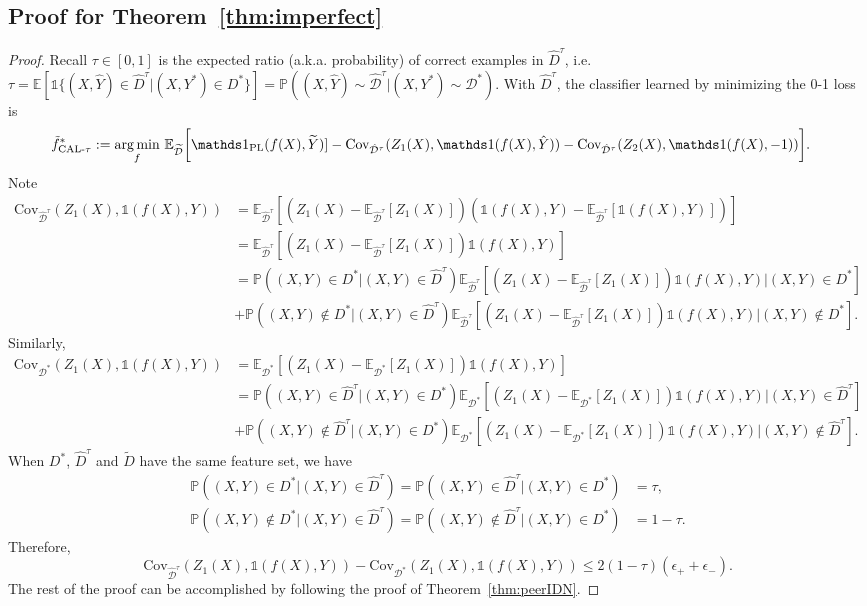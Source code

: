 \documentclass[final]{cvpr}
\DeclareMathOperator*{\argmin}{arg\,min}
\newcommand{\estDg}{{\hat D^{\tau}}}
\newcommand{\estDisg}{{\hat {\mathcal D}^{\tau}}}
\newcommand{\PP}{\mathbb P}
\newcommand{\BR}{\mathds 1}
\newcommand{\E}{\mathbb E}
\newcommand{\covpeer}{\text{CAL}}
\begin{document}
\subsection{Proof for Theorem~\ref{thm:imperfect}}\label{proof:imperfect}
\begin{proof}


Recall $\tau\in[0,1]$ is the expected ratio (a.k.a. probability) of correct examples in $\estDg$, i.e.
$\tau = \E[\BR \{ (X,\hat Y) \in \estDg | (X,Y^*) \in D^* \}] =  \PP( (X,\hat Y)\sim \estDisg | (X,Y^*)\sim \mathcal D^* ).$
With $\estDg$, the classifier learned by minimizing the 0-1 \covpeer{} loss is 
{
\begin{align*}
    \tilde f^*_{\text{\covpeer{}-}\tau}  := \argmin_{f}
& ~ \E_{\widetilde{\mathcal D}} \bigg[{\BR_{\text{PL}}}(f(X),\widetilde{Y})]  - \text{Cov}_{\estDisg}(Z_1(X),\BR(f(X),\hat Y))  - \text{Cov}_{\estDisg}(Z_2(X),\BR(f(X),-1))\bigg].
\end{align*}}
Note
\begin{align*}
    \text{Cov}_{\estDisg}(Z_1(X),\BR(f(X),Y)) 
    &= \E_{\estDisg} \left[
    \left( Z_1(X) - \E_{\estDisg}[Z_1(X)]  \right)\left( \BR(f(X),Y) - \E_{\estDisg} [\BR(f(X),Y)]  \right)\right] \\
    &= \E_{\estDisg} \left[
    \left( Z_1(X) - \E_{\estDisg}[Z_1(X)]  \right) \BR(f(X),Y)\right] \\
    &= \PP((X,Y)\in D^*|(X,Y) \in \estDg) \E_{\estDisg} \left[
    \left( Z_1(X) - \E_{\estDisg}[Z_1(X)]  \right) \BR(f(X),Y)|(X,Y)\in D^*\right] \\
    &+\PP((X,Y)\notin D^*|(X,Y) \in \estDg) \E_{\estDisg} \left[
    \left( Z_1(X) - \E_{\estDisg}[Z_1(X)]  \right) \BR(f(X),Y)|(X,Y)\notin D^*\right].
\end{align*}
Similarly,
\begin{align*}
    \text{Cov}_{\mathcal D^*}(Z_1(X),\BR(f(X),Y)) 
    &= \E_{\mathcal D^*} \left[
    \left( Z_1(X) - \E_{\mathcal D^*}[Z_1(X)]  \right) \BR(f(X),Y)\right] \\
    &= \PP((X,Y) \in \estDg | (X,Y)\in D^*) \E_{\mathcal D^*} \left[
    \left( Z_1(X) - \E_{\mathcal D^*}[Z_1(X)]  \right) \BR(f(X),Y)|(X,Y)\in \estDg\right] \\
    &+\PP((X,Y) \notin \estDg | (X,Y)\in D^*) \E_{\mathcal D^*} \left[
    \left( Z_1(X) - \E_{\mathcal D^*}[Z_1(X)]  \right) \BR(f(X),Y)|(X,Y)\notin \estDg\right].
\end{align*}
When $D^*$, $\estDg$ and $\tilde D$ have the same feature set, we have
\begin{align*}
    \PP((X,Y)\in D^*|(X,Y) \in \estDg)  = \PP((X,Y) \in \estDg | (X,Y)\in D^*) &= \tau, \\
    \PP((X,Y)\notin D^*|(X,Y) \in \estDg) = \PP((X,Y) \notin \estDg | (X,Y)\in D^*) &= 1-\tau.
\end{align*}
Therefore, 
\[
 \text{Cov}_{\estDisg}(Z_1(X),\BR(f(X),Y)) - \text{Cov}_{\mathcal D^*}(Z_1(X),\BR(f(X),Y)) 
\le 2(1-\tau)(\epsilon_+ + \epsilon_-).
\]
The rest of the proof can be accomplished by following the proof of Theorem~\ref{thm:peerIDN}.
\end{proof}
\end{document}
